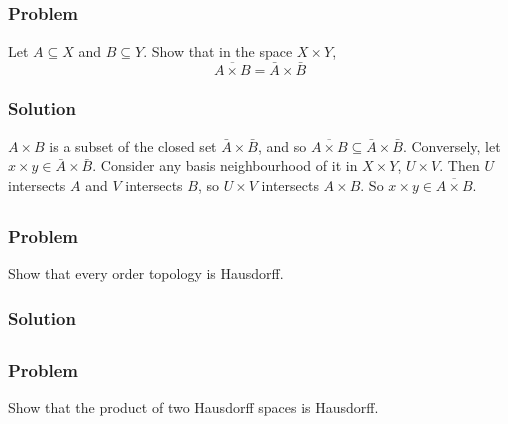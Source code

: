 
\subsection{}

\subsubsection{Problem}
Let $A \subseteq X$ and $B \subseteq Y$. Show that in the space $X \times Y$,
\[\overline{A \times B} = \bar A \times \bar B \]

\subsubsection{Solution}
$A \times B$ is a subset of the closed set $\bar A \times \bar B$, and so $\overline{A \times B} \subseteq \bar A \times \bar B$. Conversely, let $x \times y \in \bar A \times \bar B$. Consider any basis neighbourhood of it in $X \times Y$, $U \times V$. Then $U$ intersects $A$ and $V$ intersects $B$, so $U \times V$ intersects $A \times B$. So $x \times y \in \overline{A \times B}$. 


\subsection{}

\subsubsection{Problem}
Show that every order topology is Hausdorff.

\subsubsection{Solution}
\todo


\subsection{}

\subsubsection{Problem}
Show that the product of two Hausdorff spaces is Hausdorff.

